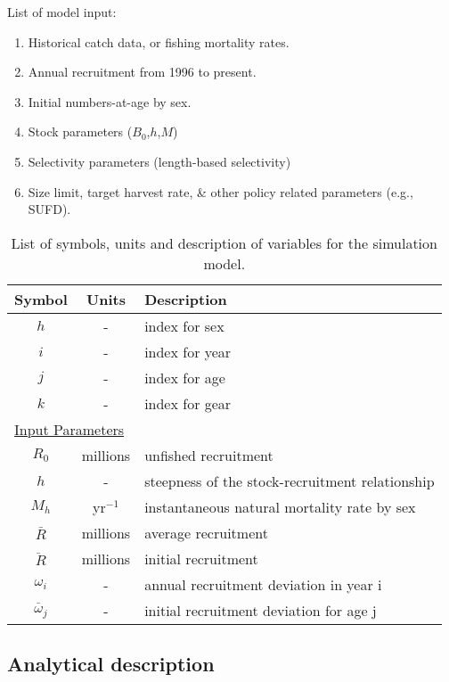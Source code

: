 List of model input:
\begin{enumerate}
	\item Historical catch data, or fishing mortality rates.
	\item Annual recruitment from 1996 to present.
	\item Initial numbers-at-age by sex.
	\item Stock parameters ($B_0$,$h$,$M$)
	\item Selectivity parameters (length-based selectivity)
	\item Size limit, target harvest rate, \& other policy related parameters (e.g., SUFD).
\end{enumerate}

\begin{table}[ht]
	\caption{List of symbols, units and description of variables for the simulation model.}
	\label{tab:ListOfSymbols}
	\begin{center}
	\begin{tabular}{ccl}
		\hline
		Symbol & Units & Description \\
		\hline
		$h$	& - & index for sex\\
		$i$	& - & index for year\\
		$j$	& - & index for age\\
		$k$	& - & index for gear\\
		\multicolumn{3}{l}{\underline{Input Parameters}}\\
		$R_0$	& millions	& unfished recruitment\\
		$h$		& -			& steepness of the stock-recruitment relationship\\
		$M_h$	& yr$^{-1}$	& instantaneous natural mortality rate by sex \\
		$\bar{R}$ & millions & average recruitment\\
		$\ddot{R}$ & millions & initial recruitment\\
		$\omega_i$ & - & annual recruitment deviation in year i\\
		$\ddot{\omega_j}$ & - & initial recruitment deviation for age j\\
		\hline
	\end{tabular}
	\end{center}
\end{table}

\subsection{Analytical description} %
\label{sub:analytical_description}

